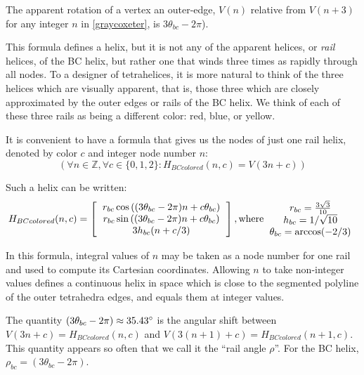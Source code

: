 \documentclass[review]{siamonline1116}
\begin{document}
The apparent rotation of a vertex an outer-edge, $V(n)$ relative from $V(n+3)$ for any integer $n$
in \eqref{graycoxeter}, is $3 \theta_{bc} - 2\pi$).

This formula defines a helix, but it is not any of the apparent helices, or \emph{rail} helices, of the
BC helix, but rather one that winds three times as rapidly through all
nodes. To a designer of tetrahelices, it is more natural to think of
the three helices which are visually apparent, that is, those three
which are closely approximated by the outer edges or rails of
the BC helix. We think of each of these three rails as being a different color: red, blue, or yellow.

It is convenient to have a formula that gives us the nodes of just
one rail helix, denoted by color $c$ and integer node number $n$:
\[
(\forall n \in \mathbb{Z}, \forall c \in \{0,1,2\} : H_{BCcolored}(n,c) = V(3n +c))
\]

Such a helix can be written:
\begin{equation}
  \label{eq:colored}
H_{BCcolored}(n,c) =
\left [
  \begin{tabular}{c}
   $ r_{bc}  \cos{((3 \theta_{bc} - 2 \pi)n + c  \theta_{bc})}  $\\
   $ r_{bc} \sin{((3 \theta_{bc} - 2 \pi)n + c  \theta_{bc})} $\\
   $ 3 h_{bc} (n + c/3)  $
  \end{tabular}
  \right ],
\text{where}
  \begin{tabular}{c}
 $ r_{bc} = \frac{3\sqrt{3}}{10} $\\
 $ h_{bc} = 1/\sqrt{10} $ \\
 $ \theta_{bc} = \arccos(-2/3) $ \\
  \end{tabular}      
\end{equation}

In this formula, integral values of $n$ may be taken as a node number for one rail and used to compute its Cartesian
coordinates. Allowing $n$ to take non-integer values defines a continuous
helix in space which is close to the segmented polyline of the outer tetrahedra edges, and equals them at integer
values.

The quantity $ (3 \theta_{bc} - 2 \pi) \approx 35.43 \degree $  is the angular shift between $V(3n + c)=H_{BCcolored}(n,c)$ and
$V(3(n+1)+c)=H_{BCcolored}(n+1,c)$.
This quantity appears so often that we call it the ``rail angle $\rho$''. For the BC helix, $\rho_{bc} = (3 \theta_{bc} - 2 \pi)$.
\end{document}
